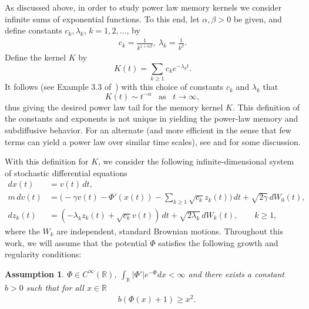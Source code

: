 \documentclass[11pt]{amsart}
\theoremstyle{definition}
\newcommand{\rbb}{\mathbb{R}}
\theoremstyle{definition}
\theoremstyle{plain}
\newtheorem{assumption}[theorem]{Assumption}
\numberwithin{equation}{section}
\begin{document}
As discussed above, in order to study power law memory kernels we consider infinite sums of exponential functions. To this end, let $\alpha, \beta >0$ be given, and define constants $c_k, \lambda_k$, $k=1,2, \ldots$, by 
\begin{align} \label{c-k}
c_k=\frac{1}{k^{1+\alpha\beta}},\ \lambda_k=\frac{1}{k^\beta}.
\end{align}   
Define the kernel $K$ by
\begin{equation}
\label{eqn:K}
K(t)=\sum_{k\geq 1} c_k e^{-\lambda_k t}.
\end{equation}
It follows (see Example 3.3 of~\cite{abate1999infinite}) with this choice of constants $c_k$ and $\lambda_k$ that
\begin{equation} \label{lim:K}
K(t) \sim t^{-\alpha} \,\,\, \text{ as } \,\,\, t\rightarrow \infty, 
\end{equation}
thus giving the desired power law tail for the memory kernel $K$. This definition of the constants and exponents is not unique in yielding the power-law memory and subdiffusive behavior. For an alternate (and more efficient in the sense that few terms can yield a power law over similar time scales), see \cite{goychuk2009viscoelastic} and \cite{goychuk2012viscoelastic} for some discussion.

With this definition for $K$, we consider the following infinite-dimensional system of stochastic differential equations 
\begin{equation}\label{eqn:GLE-Markov}
\begin{aligned}
d x(t) &= v(t)\, d t, \\
m\, d v(t)&=\big(-\gamma v(t)-\Phi'(x(t))-\sum_{k\geq 1} \sqrt{c_k} z_k(t)\big)\,dt+\sqrt{2\gamma}\, dW_0(t) ,\\
d z_k(t)&=\left(-\lambda_k z_k(t)+ \sqrt{c_k}v(t)\right) \, dt+\sqrt{2\lambda_k}\, dW_k(t),\qquad k\geq 1, 
\end{aligned}	
\end{equation}
where the $W_k$ are independent, standard Brownian motions. Throughout this work, we will assume that the potential $\Phi$ satisfies the following growth and regularity conditions:
\begin{assumption}\label{cond:Phi} $\Phi\in C^\infty(\rbb)$, $\int_\rbb|\Phi'| e^{-\Phi}dx<\infty$ and there exists a constant $b>0$ such that for all $x\in\rbb$
\begin{align*}
\quad b(\Phi(x)+1)\geq x^2.     
\end{align*}
\end{assumption}
\end{document}
